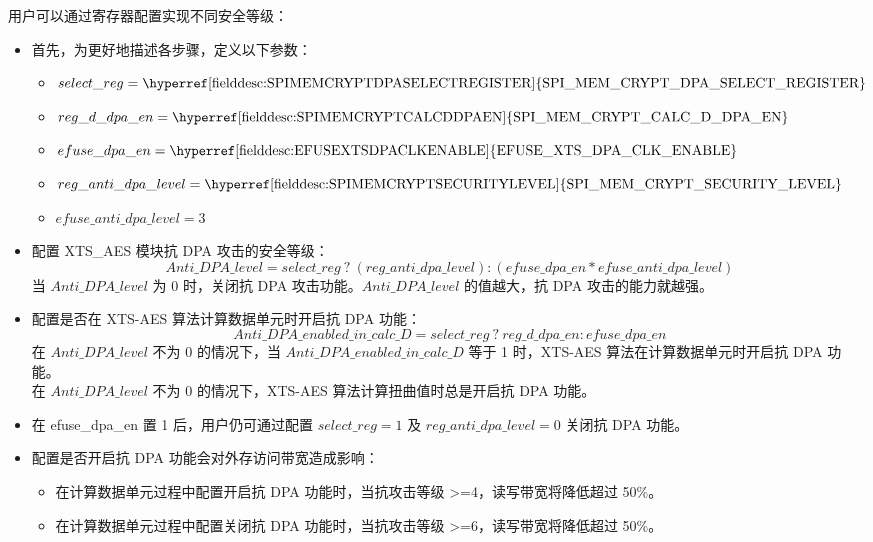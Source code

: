 \documentclass[main\_\_CN.tex]{subfiles}
\begin{document}
用户可以通过寄存器配置实现不同安全等级：
\begin{itemize}
    \item 首先，为更好地描述各步骤，定义以下参数：
    \begin{itemize}
        \item $select\_reg     = \textrm{\hyperref[fielddesc:SPIMEMCRYPTDPASELECTREGISTER]{SPI\_MEM\_CRYPT\_DPA\_SELECT\_REGISTER}}$
        \item $reg\_d\_dpa\_en = \textrm{\hyperref[fielddesc:SPIMEMCRYPTCALCDDPAEN]{SPI\_MEM\_CRYPT\_CALC\_D\_DPA\_EN}}$
        \item $efuse\_dpa\_en  = \textrm{\hyperref[fielddesc:EFUSEXTSDPACLKENABLE]{EFUSE\_XTS\_DPA\_CLK\_ENABLE}}$
        \item $reg\_anti\_dpa\_level = \textrm{\hyperref[fielddesc:SPIMEMCRYPTSECURITYLEVEL]{SPI\_MEM\_CRYPT\_SECURITY\_LEVEL}}$
        \item $efuse\_anti\_dpa\_level = \textrm{3}$
    \end{itemize}
    \item 配置 XTS\_AES 模块抗 DPA 攻击的安全等级：
    $$ Anti\_DPA\_level = select\_reg \ ?\  (reg\_anti\_dpa\_level) : (efuse\_dpa\_en * efuse\_anti\_dpa\_level) $$
    当 $Anti\_DPA\_level$ 为 0 时，关闭抗 DPA 攻击功能。$Anti\_DPA\_level$ 的值越大，抗 DPA 攻击的能力就越强。
    \item 配置是否在 XTS-AES 算法计算数据单元时开启抗 DPA 功能：
    $$ Anti\_DPA\_enabled\_in\_calc\_D = select\_reg \ ? \ reg\_d\_dpa\_en : efuse\_dpa\_en $$
    在 $Anti\_DPA\_level$ 不为 0 的情况下，当 $ Anti\_DPA\_enabled\_in\_calc\_D $ 等于 1 时，XTS-AES 算法在计算数据单元时开启抗 DPA 功能。\\
    在 $Anti\_DPA\_level$ 不为 0 的情况下，XTS-AES 算法计算扭曲值时总是开启抗 DPA 功能。
\end{itemize}


\begin{tiplisting}
\vspace{-2.5em}
\begin{itemize}
    \item 在 efuse\_dpa\_en 置 1 后，用户仍可通过配置 $select\_reg = 1$ 及 $reg\_anti\_dpa\_level = 0$ 关闭抗 DPA 功能。
    \item 配置是否开启抗 DPA 功能会对外存访问带宽造成影响：
        \begin{itemize}
            \item 在计算数据单元过程中配置开启抗 DPA 功能时，当抗攻击等级 >=4，读写带宽将降低超过 50\%。
            \item 在计算数据单元过程中配置关闭抗 DPA 功能时，当抗攻击等级 >=6，读写带宽将降低超过 50\%。
        \end{itemize}
\end{itemize}
\end{tiplisting}
\end{document}
